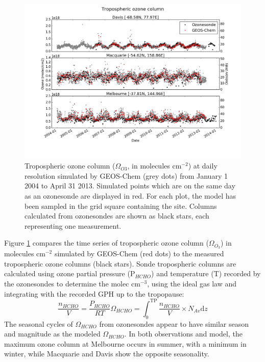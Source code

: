 \documentclass{article}
\begin{document}
  \begin{figure}[!htbp]
    \includegraphics[width=\textwidth]{figures/StationSeries.png}
    \caption{Tropospheric ozone column ($\Omega_{O3}$, in molecules cm$^{-2}$) at daily resolution simulated by GEOS-Chem (grey dots) from January 1 2004 to April 31 2013.
    Simulated points which are on the same day as an ozonesonde are displayed in red.
    For each plot, the model has been sampled in the grid square containing the site.
    Columns calculated from ozonesondes are shown as black stars, each representing one measurement.}
    \label{fig:StationSeriesGEOSChem}
  \end{figure}
  
  Figure \ref{fig:StationSeriesGEOSChem} compares the time series of tropospheric ozone column ($\Omega_{O_3}$) in molecules cm$^{-2}$ simulated by GEOS-Chem (red dots) to the measured tropospheric ozone columns (black stars).
  Sonde tropospheric columns are calculated using ozone partial pressure (P$_{HCHO}$) and temperature (T) recorded by the ozonesondes to determine the molec cm$^{-3}$, using the ideal gas law and integrating with the recorded GPH up to the tropopause:
  \begin{equation*}
    \frac{n_{HCHO}}{V} = \frac{P_{HCHO}}{RT}
    \Omega_{HCHO} = \int_{0}^{\text{TP}} \frac{n_{HCHO}}{V} \times N_{Av} \text{d}z
  \end{equation*}
  The seasonal cycles of $\Omega_{HCHO}$ from ozonesondes appear to have similar season and magnitude as the modeled $\Omega_{HCHO}$.
  In both observations and model, the maximum ozone column at Melbourne occurs in summer, with a minimum in winter, while Macquarie and Davis show the opposite seasonality.
  
\end{document}
